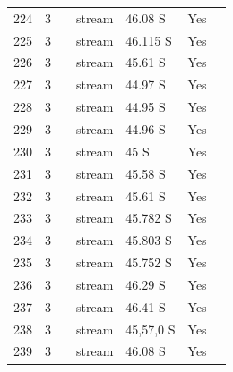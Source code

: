 \documentclass[12pt]{article}
\begin{document}
\begin{landscape}
\begin{table}[h!]
{\begin{tabular}{p{2.8cm}p{1.3cm}p{5.5cm}p{2.2cm}p{2.5cm}lp{3.5cm}}
        224   & 3 & \cite{Thompson2004c}  & stream & 46.08 S & Yes   &       \\
        225   & 3 & \cite{Thompson2004c}  & stream & 46.115 S & Yes   &       \\
        226   & 3 & \cite{Thompson2004c}  & stream & 45.61 S & Yes   &       \\
        227   & 3 & \cite{Thompson2004c}  & stream & 44.97 S & Yes   &       \\
        228   & 3 & \cite{Thompson2004c}  & stream & 44.95 S & Yes   &       \\
        229   & 3 & \cite{Thompson2004c}  & stream & 44.96 S & Yes   &       \\
        230   & 3 & \cite{Thompson2004c}  & stream & 45 S  & Yes   &       \\
        231   & 3 & \cite{Thompson2004c}  & stream & 45.58 S & Yes   &       \\
        232   & 3 & \cite{Thompson2004c}  & stream & 45.61 S & Yes   &       \\
        233   & 3 & \cite{Thompson2004c}  & stream & 45.782 S & Yes   &       \\
        234   & 3 & \cite{Thompson2004c}  & stream & 45.803 S & Yes   &       \\
        235   & 3 & \cite{Thompson2004c}  & stream & 45.752 S & Yes   &       \\
        236   & 3 & \cite{Thompson2004c}  & stream & 46.29 S & Yes   &       \\
        237   & 3 & \cite{Thompson2004c}  & stream & 46.41 S & Yes   &       \\
        238   & 3 & \cite{Thompson2004c}  & stream & 45,57,0 S & Yes   &       \\
        239   & 3 & \cite{Thompson2004c}  & stream & 46.08 S & Yes   &       \\
         \hline
      \end{tabular}}%
      \end{table}

        \newpage


\end{landscape}
\end{document}

